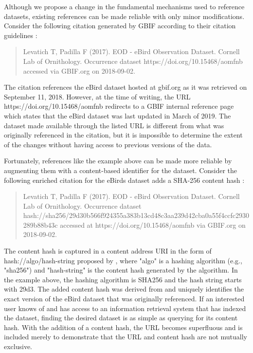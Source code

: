 Although we propose a change in the fundamental mechanisms used to reference datasets, existing references can be made reliable with only minor modifications. Consider the following citation generated by GBIF according to their citation guidelines \citep{gbif_2019}:

\begin{quote}
    Levatich T, Padilla F (2017). EOD - eBird Observation Dataset. Cornell Lab of Ornithology. Occurrence dataset https://doi.org/10.15468/aomfnb accessed via GBIF.org on 2018-09-02.
\end{quote}

The citation references the eBird dataset hosted at gbif.org as it was retrieved on September 11, 2018. However, at the time of writing, the URL https://doi.org/10.15468/aomfnb redirects to a GBIF internal reference page which states that the eBird dataset was last updated in March of 2019. The dataset made available through the listed URL is different from what was originally referenced in the citation, but it is impossible to determine the extent of the changes without having access to previous versions of the data.

Fortunately, references like the example above can be made more reliable by augmenting them with a content-based identifier for the dataset. Consider the following enriched citation for the eBirds dataset adds a SHA-256 content hash \citep{SHA2_2001}:

\begin{quote}
    Levatich T, Padilla F (2017). EOD - eBird Observation Dataset. Cornell Lab of Ornithology. Occurrence dataset hash://sha256/29d30b566f924355a383b13cd48c3aa239d42cba0a55f4ccfc2930289b88b43c accessed at https://doi.org/10.15468/aomfnb via GBIF.org on 2018-09-02.
\end{quote}

The content hash is captured in a content address URI in the form of hash://algo/hash-string proposed by \citep{Trask_2015}, where "algo" is a hashing algorithm (e.g., "sha256") and "hash-string" is the content hash generated by the algorithm. In the example above, the hashing algorithm is SHA256 and the hash string starts with 29d3. The added content hash was derived from and uniquely identifies the exact version of the eBird dataset that was originally referenced. If an interested user knows of and has access to an information retrieval system that has indexed the dataset, finding the desired dataset is as simple as querying for its content hash. With the addition of a content hash, the URL becomes superfluous and is included merely to demonstrate that the URL and content hash are not mutually exclusive.

